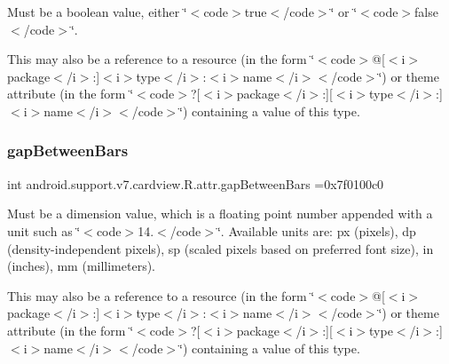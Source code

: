 Must be a boolean value, either \char`\"{}$<$code$>$true$<$/code$>$\char`\"{} or \char`\"{}$<$code$>$false$<$/code$>$\char`\"{}. 

This may also be a reference to a resource (in the form \char`\"{}$<$code$>$@\mbox{[}$<$i$>$package$<$/i$>$\+:\mbox{]}$<$i$>$type$<$/i$>$\+:$<$i$>$name$<$/i$>$$<$/code$>$\char`\"{}) or theme attribute (in the form \char`\"{}$<$code$>$?\mbox{[}$<$i$>$package$<$/i$>$\+:\mbox{]}\mbox{[}$<$i$>$type$<$/i$>$\+:\mbox{]}$<$i$>$name$<$/i$>$$<$/code$>$\char`\"{}) containing a value of this type. \mbox{\label{classandroid_1_1support_1_1v7_1_1cardview_1_1R_1_1attr_a80fbd1743023fac7c2382f1c969d7221}} 
\subsubsection{\texorpdfstring{gap\+Between\+Bars}{gapBetweenBars}}
{\footnotesize\ttfamily int android.\+support.\+v7.\+cardview.\+R.\+attr.\+gap\+Between\+Bars =0x7f0100c0\hspace{0.3cm}{\ttfamily [static]}}

Must be a dimension value, which is a floating point number appended with a unit such as \char`\"{}$<$code$>$14.\+5sp$<$/code$>$\char`\"{}. Available units are\+: px (pixels), dp (density-\/independent pixels), sp (scaled pixels based on preferred font size), in (inches), mm (millimeters). 

This may also be a reference to a resource (in the form \char`\"{}$<$code$>$@\mbox{[}$<$i$>$package$<$/i$>$\+:\mbox{]}$<$i$>$type$<$/i$>$\+:$<$i$>$name$<$/i$>$$<$/code$>$\char`\"{}) or theme attribute (in the form \char`\"{}$<$code$>$?\mbox{[}$<$i$>$package$<$/i$>$\+:\mbox{]}\mbox{[}$<$i$>$type$<$/i$>$\+:\mbox{]}$<$i$>$name$<$/i$>$$<$/code$>$\char`\"{}) containing a value of this type. \mbox{\label{classandroid_1_1support_1_1v7_1_1cardview_1_1R_1_1attr_a6a08e9ce5755d23319ad51ea7572e4fb}} 
